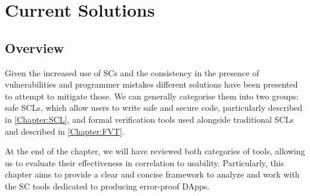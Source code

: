\documentclass[oneside]{ecsproject}     %
\newcommand{\lref}[1]{Listing~\ref{#1}}
\begin{document}
\chapter{Current Solutions}

\section{Overview}

Given the increased use of SCs and the consistency in the presence of vulnerabilities and programmer mistakes
different solutions have been presented to attempt to mitigate those. 
We can generally categorise them into two groups: safe SCLs, which allow users to write safe and secure code, particularly described in \cref{Chapter:SCL}, 
and formal verification tools used alongside traditional SCLs and described in \cref{Chapter:FVT}.

At the end of the chapter, we will have reviewed both categories of tools, allowing us to evaluate their effectiveness in correlation to usability.
Particularly, this chapter aims to provide a clear and concise framework to analyze and work with the SC tools dedicated to producing
error-proof DApps. 




\end{document}
